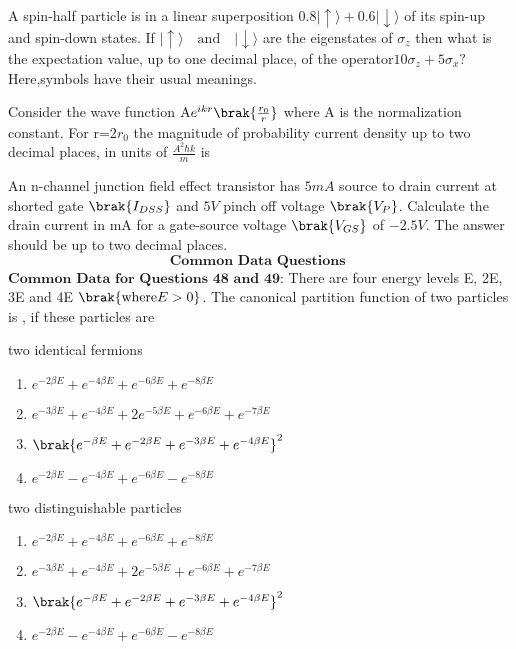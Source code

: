 \bigskip
\item A spin-half particle is in a linear superposition $0.8 \lvert \uparrow \rangle + 0.6 \lvert \downarrow \rangle$  of its spin-up and spin-down states. If $\lvert \uparrow \rangle \quad \text{and} \quad \lvert \downarrow \rangle$ are the eigenstates of $\sigma_{z}$ then what is the expectation value, up to one decimal place, of the operator$10\sigma_{z}+5\sigma_{x}?$  Here,symbols have their usual meanings.
\bigskip
\item Consider the wave function $\text{A} e^{ikr} \brak{\frac{r_{0}}{r}}$
where A is the normalization constant. For r=2$r_{0}$ the
magnitude of probability current density up to two decimal places, in units of $\frac{A^{2}\hbar k}{m}$ is 
\bigskip
\item An n-channel junction field effect transistor has $5mA$ source to drain current at shorted gate $\brak{I_{DSS}}$ and $5V$ pinch off voltage $\brak{V_{P}}$. Calculate the drain current in mA for a gate-source voltage $\brak{V_{GS}}$ of $-2.5V.$ The answer should be up to two decimal places.
\bigskip
$$\textbf{Common Data Questions }$$
$\textbf{Common Data for Questions 48 and 49:}$
\bigskip
 There are four energy levels E, 2E, 3E and 4E $\brak{\text{where}E >0}$. The canonical partition function of two particles is , if these particles are
\item two identical fermions
\begin{enumerate}
    \item $e^{-2 \beta E}+e^{-4\beta E}+e^{-6\beta E}+e^{-8\beta E}$
    \item $e^{-3 \beta E}+e^{-4\beta E}+2e^{-5\beta E}+e^{-6\beta E}+e^{-7\beta E}$
    \item $\brak{e^{- \beta E}+e^{-2\beta E}+e^{-3\beta E}+e^{-4\beta E}}^{2}$
    \item $e^{-2 \beta E}-e^{-4\beta E}+e^{-6\beta E}-e^{-8\beta E}$
\end{enumerate}
\bigskip
\item two distinguishable particles 
\begin{enumerate}
    \item $e^{-2 \beta E}+e^{-4\beta E}+e^{-6\beta E}+e^{-8\beta E}$
    \item $e^{-3 \beta E}+e^{-4\beta E}+2e^{-5\beta E}+e^{-6\beta E}+e^{-7\beta E}$
    \item $\brak{e^{- \beta E}+e^{-2\beta E}+e^{-3\beta E}+e^{-4\beta E}}^{2}$
    \item $e^{-2 \beta E}-e^{-4\beta E}+e^{-6\beta E}-e^{-8\beta E}$
\end{enumerate}
